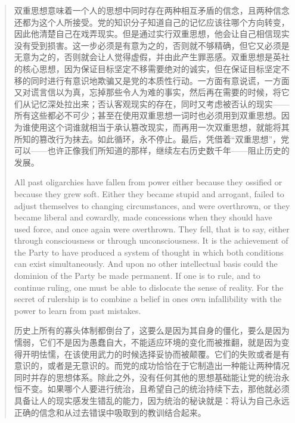 \begin{paracol}{2}
\begin{quotation}
\switchcolumn

双重思想意味着一个人的思想中同时存在两种相互矛盾的信念，且两种信念还都为这个人所接受。党的知识分子知道自己的记忆应该往哪个方向转变，因此他清楚自己在戏弄现实。但是通过实行双重思想，他会让自己相信现实没有受到损害。这一步必须是有意为之的，否则就不够精确，但它又必须是无意为之的，否则就会让人觉得虚假，并由此产生罪恶感。双重思想是英社的核心思想，因为保证目标坚定不移需要绝对的诚实，但在保证目标坚定不移的同时进行有意识地欺骗又是党的本质性行动。一方面有意说谎，一方面又对谎言信以为真，忘掉那些令人为难的事实，然后再在需要的时候，将它们从记忆深处拉出来；否认客观现实的存在，同时又考虑被否认的现实——所有这些都必不可少；甚至在使用双重思想一词时也必须用到双重思想。因为谁使用这个词谁就相当于承认篡改现实，而再用一次双重思想，就能将其所知的篡改行为抹去。如此循环，永不停止。最后，凭借着``双重思想''，党可以——也许正像我们所知道的那样，继续左右历史数千年——阻止历史的发展。

\switchcolumn*

All past oligarchies have fallen from power either because they ossified
or because they grew soft. Either they became stupid and arrogant,
failed to adjust themselves to changing circumstances, and were
overthrown, or they became liberal and cowardly, made concessions when
they should have used force, and once again were overthrown. They fell,
that is to say, either through consciousness or through unconsciousness.
It is the achievement of the Party to have produced a system of thought
in which both conditions can exist simultaneously. And upon no other
intellectual basis could the dominion of the Party be made permanent. If
one is to rule, and to continue ruling, one must be able to dislocate
the sense of reality. For the secret of rulership is to combine a belief
in one\textquotesingle s own infallibility with the power to learn from
past mistakes.

\switchcolumn

历史上所有的寡头体制都倒台了，这要么是因为其自身的僵化，要么是因为懦弱，它们不是因为愚蠢自大，不能适应环境的变化而被推翻，就是因为变得开明怯懦，在该使用武力的时候选择妥协而被颠覆。它们的失败或者是有意识的，或者是无意识的。而党的成功恰恰在于它制造出一种能让两种情况同时并存的思想体系。除此之外，没有任何其他的思想基础能让党的统治永恒不变。如果哪个人要进行统治，且希望自己的统治持续下去，那他就必须具备让人的现实感发生错乱的能力，因为统治的秘诀就是：将认为自己永远正确的信念和从过去错误中吸取到的教训结合起来。

\switchcolumn*


\end{quotation}
\end{paracol}
